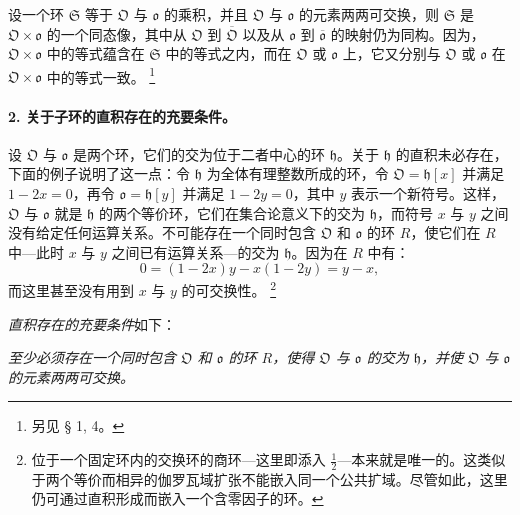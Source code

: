 \documentclass[11pt]{article}
\providecommand{\srcfn}[2]{%
  \begingroup
  \renewcommand{\thefootnote}{#1}%
  \footnote{#2}%
  \addtocounter{footnote}{-1}%
  \endgroup}
\begin{document}
设一个环 \(\mathfrak S\) 等于 \(\mathfrak O\) 与 \(\mathfrak o\) 的乘积，并且 \(\mathfrak O\) 与 \(\mathfrak o\) 的元素两两可交换，则 \(\mathfrak S\) 是 \(\mathfrak O\times\mathfrak o\) 的一个同态像，其中从 \(\mathfrak O\) 到 \(\overline{\mathfrak O}\) 以及从 \(\mathfrak o\) 到 \(\overline{\mathfrak o}\) 的映射仍为同构。因为，\(\mathfrak O\times\mathfrak o\) 中的等式蕴含在 \(\mathfrak S\) 中的等式之内，而在 \(\mathfrak O\) 或 \(\mathfrak o\) 上，它又分别与 \(\mathfrak O\) 或 \(\mathfrak o\) 在 \(\mathfrak O\times\mathfrak o\) 中的等式一致。\srcfn{8)}{另见 § 1, 4。}

\paragraph{2. 关于子环的直积存在的充要条件。}
设 \(\mathfrak O\) 与 \(\mathfrak o\) 是两个环，它们的交为位于二者中心的环 \(\mathfrak h\)。关于 \(\mathfrak h\) 的直积未必存在，下面的例子说明了这一点：令 \(\mathfrak h\) 为全体有理整数所成的环，令 \(\mathfrak O=\mathfrak h[x]\) 并满足 \(1-2x=0\)，再令 \(\mathfrak o=\mathfrak h[y]\) 并满足 \(1-2y=0\)，其中 \(y\) 表示一个新符号。这样，\(\mathfrak O\) 与 \(\mathfrak o\) 就是 \(\mathfrak h\) 的两个等价环，它们在集合论意义下的交为 \(\mathfrak h\)，而符号 \(x\) 与 \(y\) 之间没有给定任何运算关系。不可能存在一个同时包含 \(\mathfrak O\) 和 \(\mathfrak o\) 的环 \(R\)，使它们在 \(R\) 中---此时 \(x\) 与 \(y\) 之间已有运算关系---的交为 \(\mathfrak h\)。因为在 \(R\) 中有：
\[
0=(1-2x)y-x(1-2y)=y-x,
\]
而这里甚至没有用到 \(x\) 与 \(y\) 的可交换性。\srcfn{9)}{位于一个固定环内的交换环的商环---这里即添入 \(\frac12\)---本来就是唯一的。这类似于两个等价而相异的伽罗瓦域扩张不能嵌入同一个公共扩域。尽管如此，这里仍可通过直积形成而嵌入一个含零因子的环。}

\emph{直积存在的充要条件}如下：

\emph{至少必须存在一个同时包含 \(\mathfrak O\) 和 \(\mathfrak o\) 的环 \(R\)，使得 \(\mathfrak O\) 与 \(\mathfrak o\) 的交为 \(\mathfrak h\)，并使 \(\mathfrak O\) 与 \(\mathfrak o\) 的元素两两可交换。}
\end{document}
